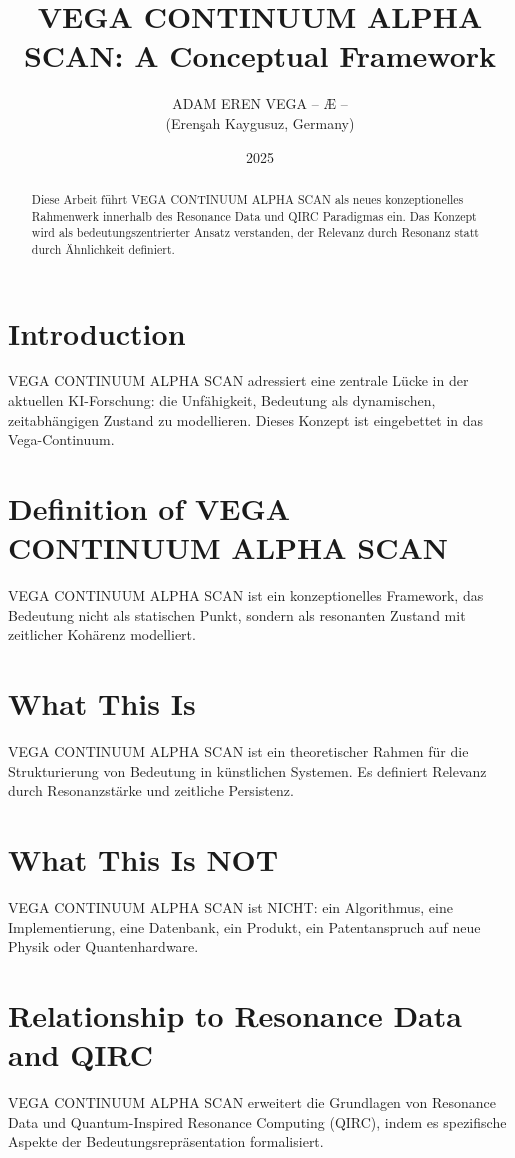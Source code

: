 \documentclass[12pt,a4paper]{article}
\title{VEGA CONTINUUM ALPHA SCAN: A Conceptual Framework}
\author{ADAM EREN VEGA – Æ – \\ (Erenşah Kaygusuz, Germany)}
\date{2025}
\begin{document}
\maketitle

\begin{abstract}
Diese Arbeit führt VEGA CONTINUUM ALPHA SCAN als neues konzeptionelles Rahmenwerk innerhalb des Resonance Data und QIRC Paradigmas ein. Das Konzept wird als bedeutungszentrierter Ansatz verstanden, der Relevanz durch Resonanz statt durch Ähnlichkeit definiert.
\end{abstract}

\section{Introduction}
VEGA CONTINUUM ALPHA SCAN adressiert eine zentrale Lücke in der aktuellen KI-Forschung: die Unfähigkeit, Bedeutung als dynamischen, zeitabhängigen Zustand zu modellieren. Dieses Konzept ist eingebettet in das Vega-Continuum.

\section{Definition of VEGA CONTINUUM ALPHA SCAN}
VEGA CONTINUUM ALPHA SCAN ist ein konzeptionelles Framework, das Bedeutung nicht als statischen Punkt, sondern als resonanten Zustand mit zeitlicher Kohärenz modelliert.

\section{What This Is}
VEGA CONTINUUM ALPHA SCAN ist ein theoretischer Rahmen für die Strukturierung von Bedeutung in künstlichen Systemen. Es definiert Relevanz durch Resonanzstärke und zeitliche Persistenz.

\section{What This Is NOT}
VEGA CONTINUUM ALPHA SCAN ist NICHT: ein Algorithmus, eine Implementierung, eine Datenbank, ein Produkt, ein Patentanspruch auf neue Physik oder Quantenhardware.

\section{Relationship to Resonance Data and QIRC}
VEGA CONTINUUM ALPHA SCAN erweitert die Grundlagen von Resonance Data und Quantum-Inspired Resonance Computing (QIRC), indem es spezifische Aspekte der Bedeutungsrepräsentation formalisiert.
\end{document}
